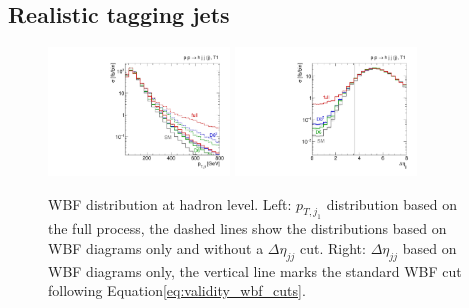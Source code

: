 \subsection{Realistic tagging jets}

\begin{figure}[t]
  \includegraphics[width=0.43\textwidth]{fig/validity/WBF_realistic_T1_j1pt.pdf}
  \hspace*{0.05\textwidth}
  \includegraphics[width=0.43\textwidth]{fig/validity/WBF_realistic_T1_deltaEtaJJ.pdf}
  \caption{WBF distribution at hadron level. Left: $p_{T,j_1}$
    distribution based on the full process, the dashed lines show the
    distributions based on WBF diagrams only and without a
    $\Delta \eta_{jj}$ cut. Right: $\Delta \eta_{jj}$ based on WBF
    diagrams only, the vertical line marks the standard WBF cut
    following Equation\;\eqref{eq:validity_wbf_cuts}.}
  \label{fig:validity_realistic_jets}
\end{figure}

